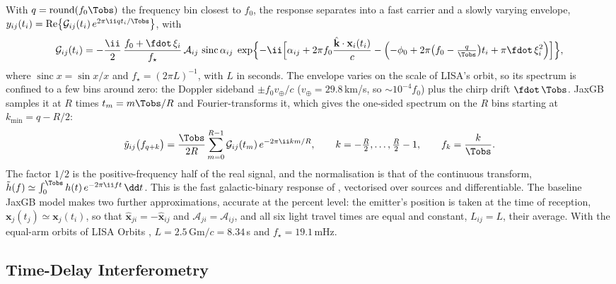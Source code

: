 With $q = \operatorname{round}(f_0\Tobs)$ the frequency bin closest to $f_0$, the response
separates into a fast carrier and a slowly varying envelope,
$y_{ij}(t_i) = \mathrm{Re}\bigl\{\mathcal G_{ij}(t_i)\,e^{2\pi\ii qt_i/\Tobs}\bigr\}$, with
\begin{equation}
  \mathcal G_{ij}(t_i) = -\frac{\ii}{2}\,\frac{f_0 + \fdot\,\xi_i}{f_{\star}}\,\mathcal A_{ij}\,
  \operatorname{sinc}\alpha_{ij}\;
  \exp\Bigl\{-\ii\Bigl[\alpha_{ij} + 2\pi f_0\frac{\hat{\mathbf k}\cdot\mathbf x_i(t_i)}{c}
  - \Bigl(-\phi_0 + 2\pi\bigl(f_0 - \tfrac{q}{\Tobs}\bigr)t_i + \pi\fdot\,\xi_i^2\Bigr)\Bigr]\Bigr\},
  \label{eq:slow}
\end{equation}
where $\operatorname{sinc}x = \sin x/x$ and $f_\star = (2\pi L)^{-1}$, with $L$ in seconds.
The envelope varies on the scale of LISA's orbit, so its spectrum is confined to a few bins
around zero: the Doppler sideband $\pm f_0v_\oplus/c$ ($v_\oplus = 29.8$\,km/s, so
$\sim10^{-4}f_0$) plus the chirp drift $\fdot\,\Tobs$. JaxGB samples it at $R$ times
$t_m = m\Tobs/R$ and Fourier-transforms it, which gives the one-sided spectrum on the $R$ bins
starting at $k_{\min} = q - R/2$:
\begin{equation}
  \tilde y_{ij}\bigl(f_{q+k}\bigr) = \frac{\Tobs}{2R}\sum_{m=0}^{R-1}\mathcal G_{ij}(t_m)\,
  e^{-2\pi\ii km/R},\qquad k = -\tfrac R2,\dots,\tfrac R2 - 1,\qquad f_k = \frac{k}{\Tobs}.
  \label{eq:heterodyne}
\end{equation}
The factor $1/2$ is the positive-frequency half of the real signal, and the normalisation is
that of the continuous transform, $\tilde h(f) \simeq \int_0^{\Tobs}h(t)\,e^{-2\pi\ii ft}\,\dd t$.
This is the fast galactic-binary response of \citet{cornish2007tests}, vectorised over
sources and differentiable. The baseline JaxGB model makes two further approximations,
accurate at the percent level: the emitter's position is taken at the time of reception,
$\mathbf x_j(t_j)\simeq\mathbf x_j(t_i)$, so that $\hat{\mathbf x}_{ji} = -\hat{\mathbf x}_{ij}$
and $\mathcal A_{ji} = \mathcal A_{ij}$, and all six light travel times are equal and constant,
$L_{ij} = L$, their average. With the equal-arm orbits of LISA Orbits \citep{lisaorbits},
$L = 2.5\,\text{Gm}/c = 8.34$\,s and $f_\star = 19.1$\,mHz.

\subsection{Time-Delay Interferometry}
\label{app:signal-tdi}

